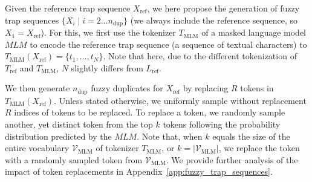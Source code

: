 Given the reference trap sequence $X_{\text{ref}}$, we here propose the generation of fuzzy trap sequences $\{X_i \mid i=2 \ldots n_{\text{dup}}\}$ (we always include the reference sequence, so $X_1 = X_\text{ref}$). For this, we first use the tokenizer $T_{\text{MLM}}$ of a masked language model $\textit{MLM}$ to encode the reference trap sequence (a sequence of textual characters) to  $T_{\text{MLM}}(X_{\text{ref}}) = \{t_1,\ldots,t_N\}$. Note that here, due to the different tokenization of $T_{\text{ref}}$ and $T_{\text{MLM}}$, $N$ slightly differs from $L_{\text{ref}}$. 

We then generate $n_{\text{dup}}$ fuzzy duplicates for $X_{\text{ref}}$ by replacing $R$ tokens in  $T_{\text{MLM}}(X_{\text{ref}})$. Unless stated otherwise, we uniformly sample without replacement $R$ indices of tokens to be replaced. To replace a token, we randomly sample another, yet distinct token from the top $k$ tokens following the probability distribution predicted by the $\textit{MLM}$. Note that, when $k$ equals the size of the entire vocabulary $\mathcal{V}_{\text{MLM}}$ of tokenizer $T_{\text{MLM}}$, or $k=|\mathcal{V}_{\text{MLM}}|$, we replace the token with a randomly sampled token from $\mathcal{V}_{\text{MLM}}$. We provide further analysis of the impact of token replacements in Appendix~\ref{app:fuzzy_trap_sequences}.
